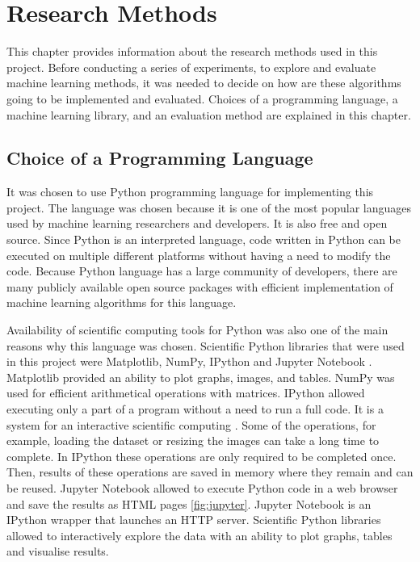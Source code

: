 \chapter{Research Methods}

This chapter provides information about the research methods used in this project. Before conducting a series of experiments, to explore and evaluate machine learning methods, it was needed to decide on how are these algorithms going to be implemented and evaluated. Choices of a programming language,  a machine learning library, and an evaluation method are explained in this chapter.

\section{Choice of a Programming Language}

 It was chosen to use Python programming language for implementing this project. The language was chosen because it is one of the most popular languages used by machine learning researchers and developers. It is also free and open source. Since Python is an interpreted language, code written in Python can be executed on multiple different platforms without having a need to modify the code. Because  Python language has a large community of developers, there are many publicly available open source packages with efficient implementation of machine learning algorithms for this language.

Availability of scientific computing tools for Python was also one of the main reasons why this language was chosen. Scientific Python libraries that were used in this project were Matplotlib, NumPy, IPython and Jupyter Notebook \citep{scipy}. Matplotlib provided an ability to plot graphs, images, and tables. NumPy was used for efficient arithmetical operations with matrices. IPython allowed executing only a part of a program without a need to run a full code. It is a system for an interactive scientific computing \citep{ipython}. Some of the operations, for example, loading the dataset or resizing the images can take a long time to complete. In IPython these operations are only required to be completed once. Then, results of these operations are saved in memory where they remain and can be reused. Jupyter Notebook allowed to execute Python code in a web browser and save the results as HTML pages \autoref{fig:jupyter}. Jupyter Notebook is an IPython wrapper that launches an HTTP server. Scientific Python libraries allowed to interactively explore the data with an ability to plot graphs, tables and visualise results.

